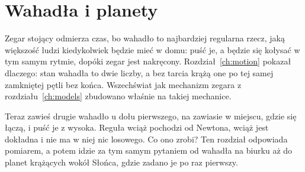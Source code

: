 
\chapter{Wahadła i planety}
\label{ch:mechanics}

\noindent
Zegar stojący odmierza czas, bo wahadło to najbardziej regularna rzecz, jaką
większość ludzi kiedykolwiek będzie mieć w domu: puść je, a będzie się kołysać
w tym samym rytmie, dopóki zegar jest nakręcony. Rozdział~\ref{ch:motion}
pokazał dlaczego: stan wahadła to dwie liczby, a bez tarcia krążą one po tej
samej zamkniętej pętli bez końca. Wszechświat jak mechanizm zegara z
rozdziału~\ref{ch:models} zbudowano właśnie na takiej mechanice.

Teraz zawieś drugie wahadło u dołu pierwszego, na zawiasie w miejscu, gdzie
się łączą, i puść je z wysoka. Reguła wciąż pochodzi od Newtona, wciąż jest
dokładna i nie ma w niej nic losowego. Co ono zrobi? Ten rozdział odpowiada
pomiarem, a potem idzie za tym samym pytaniem od wahadła na biurku aż do
planet krążących wokół Słońca, gdzie zadano je po raz pierwszy.

\begin{outcomes}
\end{outcomes}

